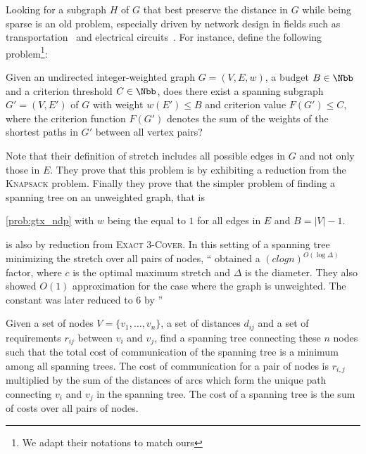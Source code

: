 Looking for a subgraph $H$ of $G$ that best preserve the distance in $G$ while being sparse is an old
problem, especially driven by network design in fields such as transportation~\autocite{RoadNetworks60}
and electrical circuits~\autocite{electricalNetworks60}. For instance, \textcite{Johnson1978} define
the following problem\footnote{We adapt their notations to match ours}:  
\begin{problem}
  \label{prob:gtx_ndp}
  Given an undirected integer-weighted graph $G=(V, E, w)$, a budget $B\in\Nbb$ and a criterion
  threshold $C\in \Nbb$, does there exist a spanning subgraph $G'=(V, E')$ of $G$ with weight
  $w(E') \leq B$ and criterion value $F(G') \leq C$, where the criterion function $F(G')$ denotes
  the sum of the weights of the shortest paths in $G'$ between all vertex pairs?
\end{problem}
Note that their definition of stretch includes all possible edges in $G$ and not only those in $E$.
They prove that this problem is \NPc{} by exhibiting a reduction from the \textsc{Knapsack}
problem. Finally they prove that the simpler problem of finding a spanning tree on an unweighted
graph, that is
\vspace{-.5\baselineskip}
\begin{problem}
  \autoref{prob:gtx_ndp} with $w$ being the equal to $1$ for all edges in $E$ and $B=|V|-1$.
\end{problem}%
\vspace{-.5\baselineskip}
\noindent is also \NPc{} by reduction from \textsc{Exact 3-Cover}.
In this setting of a spanning tree minimizing the stretch over all pairs of nodes, \enquote{
\textcite{AllPairStrech08} obtained a $(c log n)^{O(\log \Delta)}$ factor, where $c$ is the optimal
maximum stretch and $\Delta$ is the diameter.  They also showed $O(1)$ approximation for the case
where the graph is unweighted. The constant was later reduced to $6$ by \textcite{AllPairStrech10}}

\begin{problem}
Given a set of nodes $V=\{v_1, \ldots, v_n\}$, a set of distances $d_{ij}$ and a set of requirements
$r_{ij}$ between $v_i$ and $v_j$, find a spanning tree connecting these $n$ nodes such that the
total cost of communication of the spanning tree is a minimum among all spanning trees. The cost of
communication for a pair of nodes is $r_{i,j}$ multiplied by the sum of the distances of arcs which
form the unique path connecting $v_i$ and $v_j$ in the spanning tree. The cost of a spanning tree is
the sum of costs over all pairs of nodes.
\end{problem}

